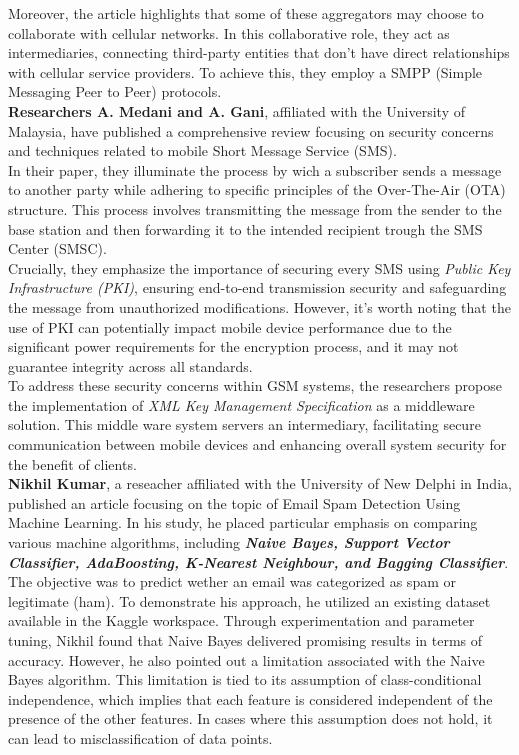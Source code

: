 \documentclass[12pt,a4paper, oneside]{book}
\begin{document}
	Moreover, the article highlights that some of these aggregators may choose to collaborate with cellular networks. In this collaborative role, they act as intermediaries, connecting third-party entities that don't have direct relationships with cellular service providers. To achieve this, they employ a SMPP (Simple Messaging Peer to Peer) protocols.\\
	
	\citep{medani2011review} \textbf{Researchers A. Medani and A. Gani}, affiliated with the University of Malaysia, have published a comprehensive review focusing on security concerns and techniques related to mobile Short Message Service (SMS).\\
	
	In their paper, they illuminate the process by wich a subscriber sends a message to another party while adhering to specific principles of the Over-The-Air (OTA) structure. This process involves transmitting the message from the sender to the base station and then forwarding it to the intended recipient trough the SMS Center (SMSC).\\
	
	Crucially, they emphasize the importance of securing every SMS using \textit{Public Key Infrastructure (PKI)}, ensuring end-to-end transmission security and safeguarding the message from unauthorized modifications. However, it's worth noting that the use of PKI can potentially impact mobile device performance due to the significant power requirements for the encryption process, and it may not guarantee integrity across all standards.\\
	
	To address these security concerns within GSM systems, the researchers propose the implementation of \textit{XML Key Management Specification} as a middleware solution. This middle ware system servers an intermediary, facilitating secure communication between mobile devices and enhancing overall system security for the benefit of clients.\\
	
	
	\citep{crawford2015survey} \textbf{Nikhil Kumar}, a reseacher affiliated with the University of New Delphi in India, published an article focusing on the topic of Email Spam Detection Using Machine Learning. In his study, he placed particular emphasis on comparing various machine algorithms, including \textbf{\textit{Naive Bayes, Support Vector Classifier, AdaBoosting, K-Nearest Neighbour, and Bagging Classifier}}. The objective was to predict wether an email was categorized as spam or legitimate (ham). To demonstrate his approach, he utilized an existing dataset available in the Kaggle workspace.\newline	
	Through experimentation and parameter tuning, Nikhil found that Naive Bayes delivered promising results in terms of accuracy. However, he also pointed out a limitation associated with the Naive Bayes algorithm. This limitation is tied to its assumption of class-conditional independence, which implies that each feature is considered independent of the presence of the other features. In cases where this assumption does not hold, it can lead to misclassification of data points.
	
\end{document}
